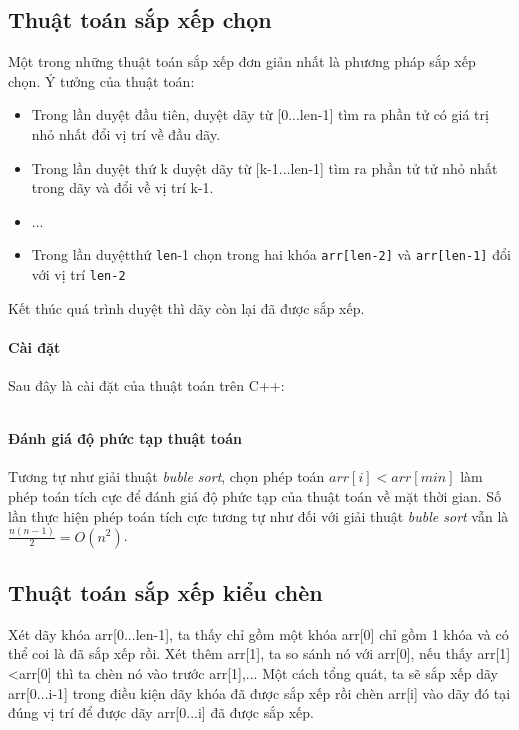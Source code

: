 \documentclass[a4paper,12pt]{report}
\newcommand{\mnt}[1]{\inputminted[frame=single, linenos=true, tabsize=4]{c++}{#1}}
\begin{document}
\subsection{Thuật toán sắp xếp chọn}

Một trong những thuật toán sắp xếp đơn giản nhất là phương pháp sắp xếp chọn. Ý tưởng của thuật toán:
\begin{itemize}
\item Trong lần duyệt đầu tiên, duyệt dãy từ [0...len-1] tìm ra phần tử có giá trị nhỏ nhất đổi vị trí về đầu dãy.
\item Trong lần duyệt thứ k duyệt dãy từ [k-1...len-1] tìm ra phần tử tử nhỏ nhất trong dãy và đổi về vị trí k-1.
\item ...
\item Trong lần duyệtthứ \texttt{len}-1 chọn trong hai khóa \texttt{arr[len-2]} và \texttt{arr[len-1]} đổi với vị trí \texttt{len-2}
\end{itemize}

Kết thúc quá trình duyệt thì dãy còn lại đã được sắp xếp.

\paragraph{Cài đặt}
Sau đây là cài đặt của thuật toán trên C++:
\mnt{src/selectionsort.cpp}

\paragraph{Đánh giá độ phức tạp thuật toán}
Tương tự như giải thuật \emph{buble sort}, chọn phép toán $arr[i] < arr[min]$ làm phép toán tích cực để đánh giá độ phức tạp của thuật toán về mặt thời gian. Số lần thực hiện phép toán tích cực tương tự như đối với giải thuật \emph{buble sort} vẫn là $\frac{n(n-1)}{2} = O(n^2)$.





\subsection{Thuật toán sắp xếp kiểu chèn}

Xét dãy khóa arr[0...len-1], ta thấy chỉ gồm một khóa arr[0] chỉ gồm 1 khóa và có thể coi là đã sắp xếp rồi. Xét thêm arr[1], ta so sánh nó với arr[0], nếu thấy arr[1]<arr[0] thì ta chèn nó vào trước arr[1],... Một cách tổng quát, ta sẽ sắp xếp dãy arr[0...i-1] trong điều kiện dãy khóa đã được sắp xếp rồi chèn arr[i] vào dãy đó tại đúng vị trí để được dãy arr[0...i] đã được sắp xếp.
\end{document}
